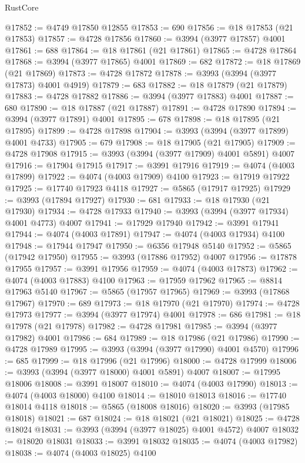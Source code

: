 \begin{lexlean}{RustCore}
\begin{coremodule}
@17852 := @4749 @17850 @12855
@17853 := 690
@17856 := @18 @17853 (@21 @17853)
@17857 := @4728 @17856
@17860 := @3994 (@3977 @17857) @4001
@17861 := 688
@17864 := @18 @17861 (@21 @17861)
@17865 := @4728 @17864
@17868 := @3994 (@3977 @17865) @4001
@17869 := 682
@17872 := @18 @17869 (@21 @17869)
@17873 := @4728 @17872
@17878 := @3993 (@3994 (@3977 @17873) @4001 @4919)
@17879 := 683
@17882 := @18 @17879 (@21 @17879)
@17883 := @4728 @17882
@17886 := @3994 (@3977 @17883) @4001
@17887 := 680
@17890 := @18 @17887 (@21 @17887)
@17891 := @4728 @17890
@17894 := @3994 (@3977 @17891) @4001
@17895 := 678
@17898 := @18 @17895 (@21 @17895)
@17899 := @4728 @17898
@17904 := @3993 (@3994 (@3977 @17899) @4001 @4733)
@17905 := 679
@17908 := @18 @17905 (@21 @17905)
@17909 := @4728 @17908
@17915 := @3993 (@3994 (@3977 @17909) @4001 @5891) @4007
@17916 := @17904 @17915
@17917 := @3991 @17916
@17919 := @4074 (@4003 @17899)
@17922 := @4074 (@4003 @17909) @4100
@17923 := @17919 @17922
@17925 := @17740 @17923 @4118
@17927 := @5865 (@17917 @17925)
@17929 := @3993 (@17894 @17927)
@17930 := 681
@17933 := @18 @17930 (@21 @17930)
@17934 := @4728 @17933
@17940 := @3993 (@3994 (@3977 @17934) @4001 @4773) @4007
@17941 := @17929 @17940
@17942 := @3991 @17941
@17944 := @4074 (@4003 @17891)
@17947 := @4074 (@4003 @17934) @4100
@17948 := @17944 @17947
@17950 := @6356 @17948 @5140
@17952 := @5865 (@17942 @17950)
@17955 := @3993 (@17886 @17952) @4007
@17956 := @17878 @17955
@17957 := @3991 @17956
@17959 := @4074 (@4003 @17873)
@17962 := @4074 (@4003 @17883) @4100
@17963 := @17959 @17962
@17965 := @8814 @17963 @5140
@17967 := @5865 (@17957 @17965)
@17969 := @3993 (@17868 @17967)
@17970 := 689
@17973 := @18 @17970 (@21 @17970)
@17974 := @4728 @17973
@17977 := @3994 (@3977 @17974) @4001
@17978 := 686
@17981 := @18 @17978 (@21 @17978)
@17982 := @4728 @17981
@17985 := @3994 (@3977 @17982) @4001
@17986 := 684
@17989 := @18 @17986 (@21 @17986)
@17990 := @4728 @17989
@17995 := @3993 (@3994 (@3977 @17990) @4001 @4570)
@17996 := 685
@17999 := @18 @17996 (@21 @17996)
@18000 := @4728 @17999
@18006 := @3993 (@3994 (@3977 @18000) @4001 @5891) @4007
@18007 := @17995 @18006
@18008 := @3991 @18007
@18010 := @4074 (@4003 @17990)
@18013 := @4074 (@4003 @18000) @4100
@18014 := @18010 @18013
@18016 := @17740 @18014 @4118
@18018 := @5865 (@18008 @18016)
@18020 := @3993 (@17985 @18018)
@18021 := 687
@18024 := @18 @18021 (@21 @18021)
@18025 := @4728 @18024
@18031 := @3993 (@3994 (@3977 @18025) @4001 @4572) @4007
@18032 := @18020 @18031
@18033 := @3991 @18032
@18035 := @4074 (@4003 @17982)
@18038 := @4074 (@4003 @18025) @4100

\end{coremodule}
\end{lexlean}
